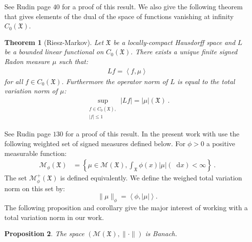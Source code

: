\documentclass[11pt,a4paper]{article}
\newcommand{\MC}{\mathcal{M}}
\newcommand{\XF}{\mathfrak{X}}
\newcommand{\brac}[1]{\left\langle#1\right\rangle}
\newcommand{\dd}{\mathop{}\!\mathrm{d}}
\newtheorem{theorem}{Theorem}[section]
\newtheorem{proposition}[theorem]{Proposition}
\begin{document}
See Rudin \cite{rudin1987real} page $40$ for a proof of this result. We also give the following theorem that gives elements of the dual of the space of functions vanishing at infinity $C_0(\XF)$.
\begin{theorem}[Riesz-Markov]
    Let $\XF$ be a locally-compact Hausdorff space and $L$ be a bounded linear functional on $C_0(\XF)$. There exists a unique finite signed Radon measure $\mu$ such that:
    \begin{align*}
        Lf = \brac{f,\mu}
    \end{align*}
    for all $f \in C_0(\XF)$. Furthermore the operator norm of $L$ is equal to the total variation norm of $\mu$:
    \begin{align*}
        \sup\limits_{\substack{f\in C_0(\XF) ,\\ |f| \leq 1}} |Lf| = |\mu|(\XF)\ .
    \end{align*}
\end{theorem}
See Rudin \cite{rudin1987real} page $130$ for a proof of this result. In the present work with use the following weighted set of signed measures defined below. For $\phi > 0$ a positive measurable function:
\begin{align*}
    \MC_{\phi}\left(\XF\right) &=  \left\lbrace \mu \in \MC\left(\XF\right) , \int_{\XF}\phi(x) |\mu|\left(\dd x\right) < \infty\right\rbrace\ .
\end{align*}
The set $\MC^+_{\phi}\left(\XF\right)$ is defined equivalently. We define the weighed total variation norm on this set by:
\[
\| \mu\|_{\phi} = \brac{\phi,|\mu|}.
\]
The following proposition and corollary give the major interest of working with a total variation norm in our work.
\begin{proposition}
    The space \(\left(\MC\left(\XF\right),\| \cdot\|\right) \) is Banach.
\end{proposition}
\end{document}
